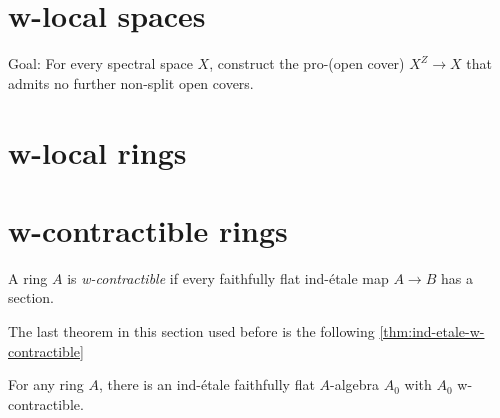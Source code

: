 \section{w-local spaces}

Goal: For every spectral space \(X\), construct the pro-(open cover) \(X^Z \to X\) that admits no further non-split open covers.


\section{w-local rings}

\section{w-contractible rings}

\begin{definition}
A ring \(A\) is \emph{w-contractible} if every faithfully flat ind-\'etale map \(A \to B\) has a section.
    \label{def:w-contractible}
\end{definition}

The last theorem in this section used before \cite[Theorem 5.6.2]{proetale} is the following \cref{thm:ind-etale-w-contractible}

\begin{lemma}
For any ring $A$, there is an ind-\'etale faithfully flat $A$-algebra $A_0$ with $A_0$ w-contractible.
    \label{thm:ind-etale-w-contractible}
\end{lemma}

